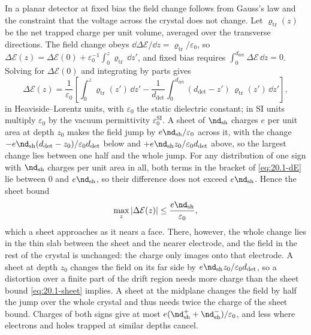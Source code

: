 In a planar detector at fixed bias the field change follows from Gauss's law and the constraint that the voltage across the crystal does not change. Let $\varrho_{\mathrm{tr}}(z)$ be the net trapped charge per unit volume, averaged over the transverse directions. The field change obeys $\dd\Delta\mathcal{E}/\dd z = \varrho_{\mathrm{tr}}/\varepsilon_0$, so $\Delta\mathcal{E}(z) = \Delta\mathcal{E}(0) + \varepsilon_0^{-1}\int_0^z\varrho_{\mathrm{tr}}\,\dd z'$, and fixed bias requires $\int_0^{d_{\mathrm{det}}}\Delta\mathcal{E}\,\dd z = 0$. Solving for $\Delta\mathcal{E}(0)$ and integrating by parts gives
\begin{equation}
  \Delta\mathcal{E}(z) = \frac{1}{\varepsilon_0}\left[\int_0^z\varrho_{\mathrm{tr}}(z')\,\dd z' - \frac{1}{d_{\mathrm{det}}}\int_0^{d_{\mathrm{det}}}(d_{\mathrm{det}} - z')\,\varrho_{\mathrm{tr}}(z')\,\dd z'\right] ,
  \label{eq:20.1-dE}
\end{equation}
in Heaviside--Lorentz units, with $\varepsilon_0$ the static dielectric constant; in SI units multiply $\varepsilon_0$ by the vacuum permittivity $\varepsilon_0^{\mathrm{SI}}$. A sheet of $\nd_{\mathrm{sh}}$ charges $e$ per unit area at depth $z_0$ makes the field jump by $e\nd_{\mathrm{sh}}/\varepsilon_0$ across it, with the change $-e\nd_{\mathrm{sh}}(d_{\mathrm{det}} - z_0)/\varepsilon_0d_{\mathrm{det}}$ below and $+e\nd_{\mathrm{sh}}z_0/\varepsilon_0d_{\mathrm{det}}$ above, so the largest change lies between one half and the whole jump. For any distribution of one sign with $\nd_{\mathrm{sh}}$ charges per unit area in all, both terms in the bracket of \cref{eq:20.1-dE} lie between 0 and $e\nd_{\mathrm{sh}}$, so their difference does not exceed $e\nd_{\mathrm{sh}}$. Hence the sheet bound
\begin{equation}
  \max_z|\Delta\mathcal{E}(z)| \le \frac{e\nd_{\mathrm{sh}}}{\varepsilon_0} ,
  \label{eq:20.1-sheet}
\end{equation}
which a sheet approaches as it nears a face. There, however, the whole change lies in the thin slab between the sheet and the nearer electrode, and the field in the rest of the crystal is unchanged: the charge only images onto that electrode. A sheet at depth $z_0$ changes the field on its far side by $e\nd_{\mathrm{sh}}z_0/\varepsilon_0d_{\mathrm{det}}$, so a distortion over a finite part of the drift region needs more charge than the sheet bound \cref{eq:20.1-sheet} implies. A sheet at the midplane changes the field by half the jump over the whole crystal and thus needs twice the charge of the sheet bound. Charges of both signs give at most $e(\nd_{\mathrm{sh}}^+ + \nd_{\mathrm{sh}}^-)/\varepsilon_0$, and less where electrons and holes trapped at similar depths cancel.


